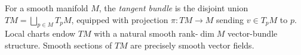 
For a smooth manifold $M$, the \emph{tangent bundle} is the disjoint union $TM=\bigsqcup_{p\in M}T_pM$, equipped with projection $\pi:TM\to M$ sending $v\in T_pM$ to $p$. Local charts endow $TM$ with a natural smooth rank-$\dim M$ vector-bundle structure. Smooth sections of $TM$ are precisely smooth vector fields.
